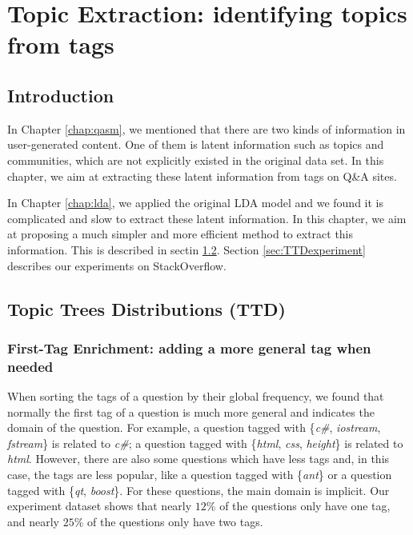 \chapter{Topic Extraction: identifying topics from tags}
\doublespacing
\label{chap:ttd}
\minitoc

\section{Introduction}
In Chapter \ref{chap:qasm}, we mentioned that there are two kinds of information in user-generated content. One of them is latent information such as topics and communities, which are not explicitly existed in the original data set. In this chapter, we aim at extracting these latent information from tags on Q\&A sites.

In Chapter \ref{chap:lda}, we applied the original LDA model and we found it is complicated and slow to extract these latent information. In this chapter, we aim at proposing a much simpler and more efficient method to extract this information. This is described in sectin \ref{sec:TTD}. Section \ref{sec:TTDexperiment} describes our experiments on StackOverflow.

\section{Topic Trees Distributions (TTD)}\label{sec:TTD}




\subsection{First-Tag Enrichment: adding a more general tag when needed}
When sorting the tags of a question by their global frequency, we found that normally the first tag of a question is much more general and indicates the domain of the question. For example, a question tagged with \{\textit{c\#}, \textit{iostream}, \textit{fstream}\} is related to \textit{c\#}; a question tagged with \{\textit{html}, \textit{css}, \textit{height}\} is related to \textit{html}. However, there are also some questions which have less tags and, in this case, the tags are less popular, like a question tagged with \{\textit{ant}\} or a question tagged with \{\textit{qt}, \textit{boost}\}. For these questions, the main domain is implicit. Our experiment dataset shows that nearly $12\%$ of the questions only have one tag, and nearly $25\%$ of the questions only have two tags.

